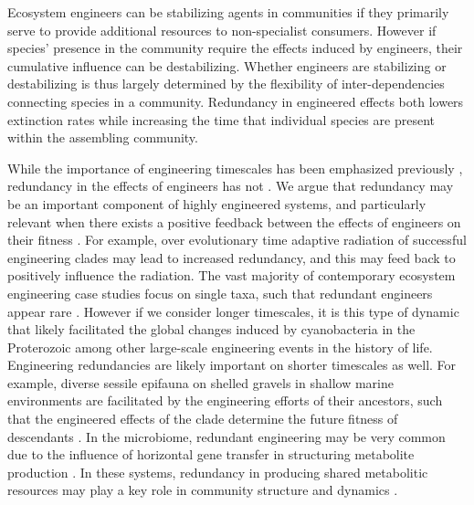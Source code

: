 \documentclass[9pt,twocolumn,twoside]{pnas-new}
\begin{document}


Ecosystem engineers can be stabilizing agents in communities if they primarily serve to provide additional resources to non-specialist consumers.
However if species' presence in the community require the effects induced by engineers, their cumulative influence can be destabilizing.
Whether engineers are stabilizing or destabilizing is thus largely determined by the flexibility of inter-dependencies connecting species in a community.
Redundancy in engineered effects both lowers extinction rates while increasing the time that individual species are present within the assembling community.

While the importance of engineering timescales has been emphasized previously \cite{Hastings2007}, redundancy in the effects of engineers has not \cite{Lawton1994}.
We argue that redundancy may be an important component of highly engineered systems, and particularly relevant when there exists a positive feedback between the effects of engineers on their fitness \cite{Cuddington2004}.
For example, over evolutionary time adaptive radiation of successful engineering clades may lead to increased redundancy, and this may feed back to positively influence the radiation.
The vast majority of contemporary ecosystem engineering case studies focus on single taxa, such that redundant engineers appear rare \cite{Lawton1994}.
However if we consider longer timescales, it is this type of dynamic that likely facilitated the global changes induced by cyanobacteria in the Proterozoic \cite{Schirrmeister2013} among other large-scale engineering events in the history of life.
Engineering redundancies are likely important on shorter timescales as well.
For example, diverse sessile epifauna on shelled gravels in shallow marine environments are facilitated by the engineering efforts of their ancestors, such that the engineered effects of the clade determine the future fitness of descendants \cite{Kidwell1986}.
In the microbiome, redundant engineering may be very common due to the influence of horizontal gene transfer in structuring metabolite production \cite{Polz2013}.
In these systems, redundancy in producing shared metabolitic resources may play a key role in community structure and dynamics \cite{Kallus2017,Muscarella2017}.
\end{document}
